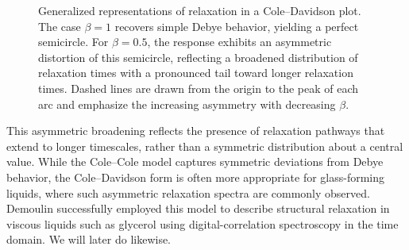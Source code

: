 \begin{figure}[!htbp]
	\centering
	\caption{Generalized representations of relaxation in a Cole--Davidson plot. The case $\beta = 1$ recovers simple Debye behavior, yielding a perfect semicircle. For $\beta = 0.5$, the response exhibits an asymmetric distortion of this semicircle, reflecting a broadened distribution of relaxation times with a pronounced tail toward longer relaxation times. Dashed lines are drawn from the origin to the peak of each arc and emphasize the increasing asymmetry with decreasing $\beta$.}
	\label{fig:DebyeColeDavidson}
\end{figure}

\noindent This asymmetric broadening reflects the presence of relaxation pathways that extend to longer timescales, rather than a symmetric distribution about a central value. While the Cole--Cole model captures symmetric deviations from Debye behavior, the Cole--Davidson form is often more appropriate for glass-forming liquids, where such asymmetric relaxation spectra are commonly observed. Demoulin \etal successfully employed this model to describe structural relaxation in viscous liquids such as glycerol using digital-correlation spectroscopy in the time domain. We will later do likewise.

